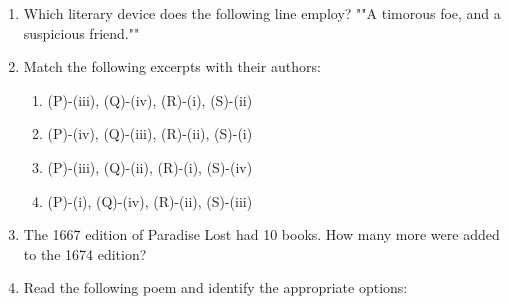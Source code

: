 \documentclass[12pt]{article}
\theoremstyle{remark}
\begin{document}
\begin{enumerate}
\begin{enumerate}  \end{enumerate}
\hfill{}
\item Which literary device does the following line employ?
""A timorous foe, and a suspicious friend."" 
\begin{enumerate}  \end{enumerate}
\hfill{}
\item Match the following excerpts with their authors: 
\begin{table}[H]

\caption{}
\label{Table 1.1}
\end{table}
\begin{enumerate}
\item (P)-(iii), (Q)-(iv), (R)-(i), (S)-(ii) 
\item (P)-(iv), (Q)-(iii), (R)-(ii), (S)-(i) 
\item (P)-(iii), (Q)-(ii), (R)-(i), (S)-(iv) 
\item (P)-(i), (Q)-(iv), (R)-(ii), (S)-(iii) 
\end{enumerate}
\hfill{}
\item The 1667 edition of Paradise Lost had 10 books. How many more were added to
the 1674 edition? 
\begin{enumerate}  \end{enumerate}
\hfill{}
\item Read the following poem and identify the appropriate options: 

\end{enumerate}
\end{document}
